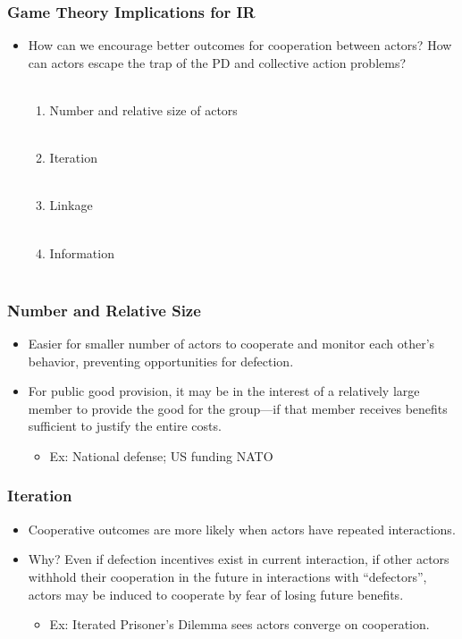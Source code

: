 \documentclass[handout]{beamer}
\begin{document}
\begin{frame} 
 \frametitle{\LARGE{Game Theory Implications for IR}}
 	\begin{itemize}
 		\item How can we encourage better outcomes for cooperation between actors? How can actors escape the trap of the PD and collective action problems? \pause \\~\\
 		\begin{enumerate}
 			\item Number and relative size of actors \pause \\~\\
 		    \item Iteration \pause \\~\\
 		    \item Linkage \pause  \\~\\
 		    \item Information  \\~\\
 		\end{enumerate}
 	\end{itemize}
 \end{frame}

\begin{frame} 
	\frametitle{\LARGE{Number and Relative Size}}
	\begin{itemize}
		\item Easier for smaller number of actors to cooperate and monitor each other’s behavior, preventing opportunities for defection. \pause
		\item For public good provision, it may be in the interest of a relatively large member to provide the good for the group—if that member receives benefits sufficient to justify the entire costs.
		\begin{itemize}
			\item Ex: National defense; US funding NATO
		\end{itemize}
	\end{itemize}
\end{frame}

\begin{frame} 
	\frametitle{\LARGE{Iteration}}
	\begin{itemize}
		\item Cooperative outcomes are more likely when actors have repeated interactions. \pause
		\item Why? Even if defection incentives exist in current interaction, if other actors withhold their cooperation in the future in interactions with “defectors”, actors may be induced to cooperate by fear of losing future benefits.
		\begin{itemize}
			\item Ex: Iterated Prisoner's Dilemma sees actors converge on cooperation.
		\end{itemize}
	\end{itemize}
\end{frame}
\end{document}
